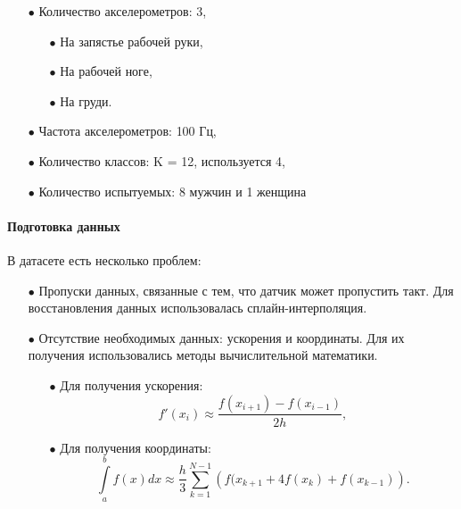 \documentclass[12pt, twoside]{article}
\begin{document}
        \begin{itemize}

            \item[$\bullet$] Количество акселерометров: 3,
                    
                    \begin{itemize}

                        \item[$\bullet$] На запястье рабочей руки,

                        \item[$\bullet$] На рабочей ноге,

                        \item[$\bullet$] На груди.

                    \end{itemize}

            \item[$\bullet$] Частота акселерометров: 100 Гц,
            
            \item[$\bullet$] Количество классов: K = 12, используется 4,

            \item[$\bullet$] Количество испытуемых: 8 мужчин и 1 женщина

        \end{itemize}

    \paragraph{Подготовка данных \cite{processing}}

        В датасете есть несколько проблем:
        \begin{itemize}
    
            \item[$\bullet$] Пропуски данных, связанные с тем, что датчик может пропустить такт. Для восстановления данных использовалась сплайн-интерполяция.

            \item[$\bullet$] Отсутствие необходимых данных: ускорения и координаты. Для их получения использовались методы вычислительной математики.

                \begin{itemize}

                    \item[$\bullet$] Для получения ускорения:
                         $$f'(x_i) \approx \frac{f(x_{i + 1}) - f(x_{i - 1})}{2h},$$

                    \item[$\bullet$] Для получения координаты:
                        $$\int\limits_a^b f(x) dx \approx \frac{h}{3} \sum\limits_{k = 1}^{N - 1} \left( f(x_{k + 1} + 4f(x_k) + f(x_{k - 1}) \right).$$

                \end{itemize}

        \end{itemize}
\end{document}
